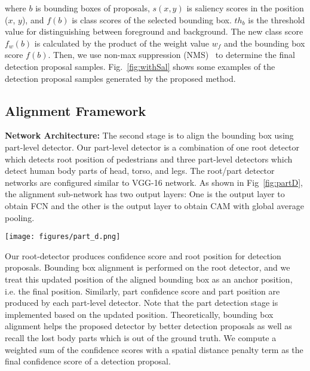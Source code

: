 \documentclass[journal]{IEEEtran}
\begin{document}
where $b$ is bounding boxes of proposals, $s(x,y)$ is saliency scores in the position ($x$, $y$), and $f(b)$ is class scores of the selected bounding box. $th_{b}$ is the threshold value for distinguishing between foreground and background. The new class score $f_{w}(b)$ is calculated by the product of the weight value $w_{f}$ and the bounding box score $f(b)$. Then, we use non-max suppression (NMS)~\cite{ren2015faster} to determine the final detection proposal samples. Fig.~\ref{fig:withSal} shows some examples of the detection proposal samples generated by the proposed method.


\subsection{Alignment Framework}
\label{subsec:AlignmentFramework}
\textbf{Network Architecture:} The second stage is to align the bounding box using part-level detector. Our part-level detector is a combination of one root detector which detects root position of pedestrians and three part-level detectors which detect human body parts of head, torso, and legs. The root/part detector networks are configured similar to VGG-16 network. As shown in Fig~\ref{fig:partD}, the alignment sub-network has two output layers: One is the output layer to obtain FCN and the other is the output layer to obtain CAM with global average pooling.

\begin{figure*}[t]
\centering
\centerline{\texttt{[image: figures/part\_d.png]}}
\caption{Network architecture of the proposed part-level detector based on VGG-16 network with class activation map}
\label{fig:partD}
\end{figure*}

Our root-detector produces confidence score and root position for detection proposals. Bounding box alignment is performed on the root detector, and we treat this updated position of the aligned bounding box as an anchor position, i.e. the final position. Similarly, part confidence score and part position are produced by each part-level detector. Note that the part detection stage is implemented based on the updated position. Theoretically, bounding box alignment helps the proposed detector by better detection proposals as well as recall the lost body parts which is out of the ground truth. We compute a weighted sum of the confidence scores with a spatial distance penalty term as the final confidence score of a detection proposal.  \\
\end{document}
